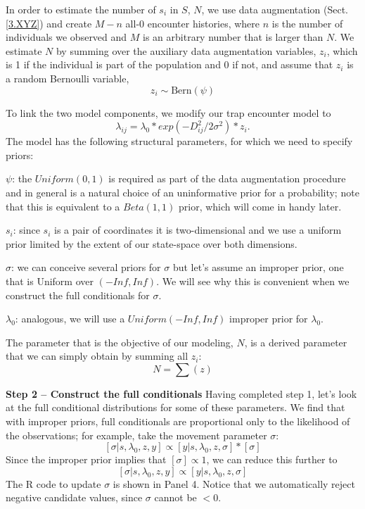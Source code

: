 In order to estimate the number of $s_i$ in $S$, $N$, we use data augmentation (Sect. \ref{3.XYZ}) and create $M-n$ all-0 encounter histories, where $n$ is the number of individuals we observed and $M$ is an arbitrary number that is larger than $N$. We estimate $N$ by summing over the auxiliary data augmentation variables, $z_i$, which is 1 if the individual is part of the population and 0 if not, and assume that $z_i$ is a random Bernoulli variable,
\[
z_{i} \sim \mbox{Bern}(\psi)
\]


To link the two model components, we modify our trap encounter model to
\[
\lambda_{ij} = \lambda_0 * exp(-D_{ij}^2/2\sigma^2) * z_{i}.
\]
The model has the following structural parameters, for which we need to specify priors:

$\psi$: the $Uniform (0,1)$ is required as part of the data augmentation procedure and in general is a natural choice of an uninformative prior for a probability; note that this is equivalent to a $Beta(1,1)$ prior, which will come in handy later.

$s_{i}$: since $s_{i}$ is a pair of coordinates it is two-dimensional and we use a uniform prior limited by the extent of our state-space over both dimensions.

$\sigma$: we can conceive several priors for $\sigma$ but let's assume an improper prior, one that is Uniform over $(-Inf, Inf)$. We will see why this is convenient when we construct the full conditionals for $\sigma$.

$\lambda_{0}$: analogous, we will use a $Uniform (-Inf, Inf)$ improper prior for $\lambda_{0}$.

The parameter that is the objective of our modeling, $N$, is a derived parameter that we can simply obtain by summing all $z_i$:
\[
N=\sum(z)
\]


{\bf Step 2 -- Construct the full conditionals}
Having completed step 1, let's look at the full conditional distributions for some of these parameters.
We find that with improper priors, full conditionals are proportional only to the likelihood of the observations; for example, take the movement parameter $\sigma$:
\[
[\sigma|s, \lambda_{0}, z, y] \propto [y| s, \lambda_{0}, z, \sigma] * [\sigma]
\]
Since the improper prior implies that $[\sigma] \propto 1$, we can reduce this further to
\[
[\sigma|s, \lambda_{0}, z, y] \propto [y| s, \lambda_{0}, z, \sigma]
\]
The R code to update $\sigma$ is shown in Panel 4. Notice that we automatically reject negative candidate values, since $\sigma$ cannot be $<0$.  

